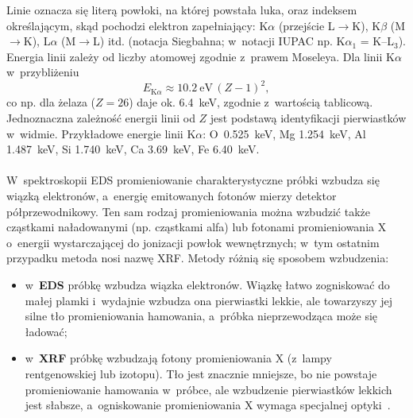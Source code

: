 Linie oznacza się literą powłoki, na której powstała luka, oraz
indeksem określającym, skąd pochodzi elektron zapełniający:
K$\alpha$ (przejście L$\to$K), K$\beta$ (M$\to$K), L$\alpha$ (M$\to$L)
itd. (notacja Siegbahna; w~notacji IUPAC np. K$\alpha_1$ = K--L$_3$).
Energia linii zależy od liczby atomowej zgodnie z~prawem Moseleya.
Dla linii K$\alpha$ w~przybliżeniu
\begin{equation}
  E_{\mathrm{K}\alpha} \approx \SI{10.2}{\electronvolt}\,(Z-1)^2,
\end{equation}
co np. dla żelaza ($Z=26$) daje ok. \SI{6.4}{\kilo\electronvolt},
zgodnie z~wartością tablicową. Jednoznaczna zależność energii linii od
$Z$ jest podstawą identyfikacji pierwiastków w~widmie.
Przykładowe energie linii K$\alpha$: O~\SI{0.525}{\kilo\electronvolt},
Mg \SI{1.254}{\kilo\electronvolt}, Al \SI{1.487}{\kilo\electronvolt},
Si \SI{1.740}{\kilo\electronvolt}, Ca \SI{3.69}{\kilo\electronvolt},
Fe \SI{6.40}{\kilo\electronvolt}.

\paragraph{}
\begin{zmiana}
W~spektroskopii EDS promieniowanie charakterystyczne próbki wzbudza się
wiązką elektronów, a~energię emitowanych fotonów mierzy detektor
półprzewodnikowy. Ten sam rodzaj promieniowania można wzbudzić także
cząstkami naładowanymi (np. cząstkami alfa) lub fotonami promieniowania X
o~energii wystarczającej do jonizacji powłok wewnętrznych; w~tym
ostatnim przypadku metoda nosi nazwę XRF. Metody różnią się sposobem
wzbudzenia:
\end{zmiana}
\begin{itemize}
  \item w~\textbf{EDS} próbkę wzbudza wiązka
        elektronów. Wiązkę łatwo zogniskować do małej plamki
        i~wydajnie wzbudza ona pierwiastki lekkie, ale towarzyszy jej
        silne tło promieniowania hamowania, a~próbka nieprzewodząca może
        się ładować;
  \item w~\textbf{XRF} próbkę wzbudzają fotony promieniowania X (z~lampy
        rentgenowskiej lub izotopu). Tło jest znacznie mniejsze, bo nie
        powstaje promieniowanie hamowania w~próbce, ale wzbudzenie
        pierwiastków lekkich jest słabsze, a~ogniskowanie promieniowania
        X wymaga specjalnej optyki~\cite{beckhoff2006xrf}.
\end{itemize}

